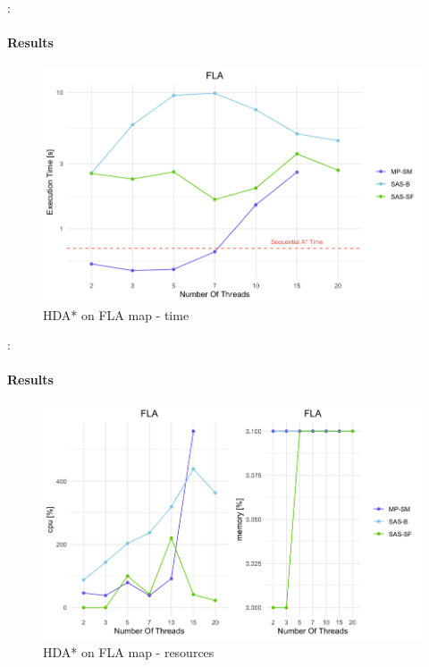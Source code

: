 \documentclass[12pt]{beamer}
\begin{document}
	\begin{frame}{\secname : \subsecname}
		\framesubtitle{Results}
		\begin{figure}[ht!]
			\centering
			\includegraphics[width=0.8\linewidth]{hda/flatime.png}
			\caption{HDA* on FLA map - time}
		\end{figure}
	\end{frame}
	\begin{frame}{\secname : \subsecname}
		\framesubtitle{Results}
		\begin{figure}[ht!]
			\centering
			\includegraphics[width=0.8\linewidth]{hda/flacpumem.png}
			\caption{HDA* on FLA map - resources}
		\end{figure}
	\end{frame}
\end{document}
